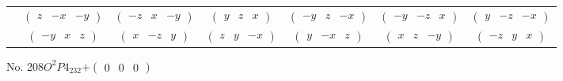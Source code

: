 \documentclass[fleqn,9pt,landscape]{jsarticle}
\begin{document}
\begin{center}
\begin{longtable}{ccccccc}
& $ \begin{pmatrix} z & - x & - y \end{pmatrix} $ & $ \begin{pmatrix} - z & x & - y \end{pmatrix} $ & $ \begin{pmatrix} y & z & x \end{pmatrix} $ & $ \begin{pmatrix} - y & z & - x \end{pmatrix} $ & $ \begin{pmatrix} - y & - z & x \end{pmatrix} $ & $ \begin{pmatrix} y & - z & - x \end{pmatrix} $ \\
& $ \begin{pmatrix} - y & x & z \end{pmatrix} $ & $ \begin{pmatrix} x & - z & y \end{pmatrix} $ & $ \begin{pmatrix} z & y & - x \end{pmatrix} $ & $ \begin{pmatrix} y & - x & z \end{pmatrix} $ & $ \begin{pmatrix} x & z & - y \end{pmatrix} $ & $ \begin{pmatrix} - z & y & x \end{pmatrix} $ \\
\end{longtable}
\end{center}
\newpage
No. 208\quad$O_{}^{2}$\quad$P4_232$\quad[ cubic ]\quad$+\begin{pmatrix} 0 & 0 & 0 \end{pmatrix}$
\end{document}
